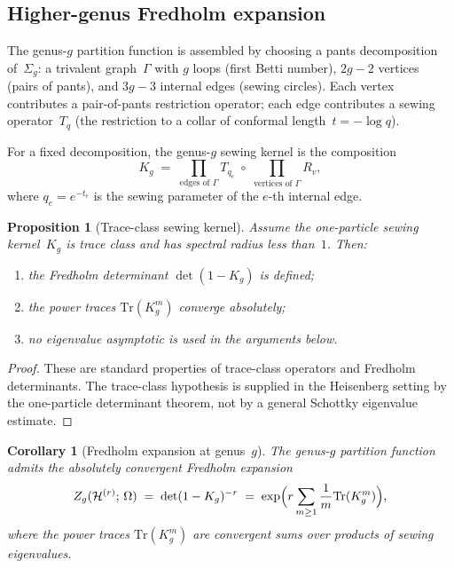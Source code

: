 \documentclass[11pt,reqno]{amsart}
\newtheorem{proposition}[theorem]{Proposition}
\newtheorem{corollary}[theorem]{Corollary}
\theoremstyle{definition}
\theoremstyle{remark}
\newcommand{\cH}{\mathcal{H}}
\newcommand{\Tr}{\mathrm{Tr}}
\newcommand{\GG}{\Gamma}
\numberwithin{equation}{section}
\begin{document}
\subsection{Higher-genus Fredholm expansion}
\label{subsec:higher-genus-heisenberg}

The genus-$g$ partition function is assembled by choosing a
pants decomposition of~$\Sigma_g$: a trivalent graph~$\GG$ with
$g$ loops (first Betti number), $2g - 2$ vertices (pairs of
pants), and $3g - 3$ internal edges (sewing circles).  Each
vertex contributes a pair-of-pants restriction operator; each
edge contributes a sewing operator~$T_q$ (the restriction to a
collar of conformal length~$t = -\log q$).

For a fixed decomposition, the genus-$g$ sewing kernel is the
composition
\begin{equation}\label{eq:genus-g-kernel}
K_g
\;=\;
\prod_{\text{edges of }\GG} T_{q_e}
\;\circ\;
\prod_{\text{vertices of }\GG} R_v,
\end{equation}
where $q_e = e^{-t_e}$ is the sewing parameter of the $e$-th
internal edge.

\begin{proposition}[Trace-class sewing kernel]
\label{prop:sewing-eigenvalues}
Assume the one-particle sewing kernel~$K_g$ is trace class and has
spectral radius less than~$1$. Then:
\begin{enumerate}[label=\textup{(\roman*)}]
\item the Fredholm determinant $\det(1-K_g)$ is defined;
\item the power traces $\Tr(K_g^m)$ converge absolutely;
\item no eigenvalue asymptotic is used in the arguments below.
\end{enumerate}
\end{proposition}

\begin{proof}
These are standard properties of trace-class operators and
Fredholm determinants. The trace-class hypothesis is supplied in
the Heisenberg setting by the one-particle determinant theorem, not
by a general Schottky eigenvalue estimate.
\end{proof}

\begin{corollary}[Fredholm expansion at genus~$g$]
\label{cor:fredholm-expansion-g}
The genus-$g$ partition function admits the absolutely
convergent Fredholm expansion
\begin{equation}\label{eq:fredholm-expansion}
Z_g(\cH^{(r)};\,\Omega)
\;=\;
\det(1 - K_g)^{-r}
\;=\;
\exp\Bigl(r\sum_{m \geq 1}
\frac{1}{m}\Tr(K_g^m)\Bigr),
\end{equation}
where the power traces $\Tr(K_g^m)$ are convergent sums over
products of sewing eigenvalues.
\end{corollary}
\end{document}
